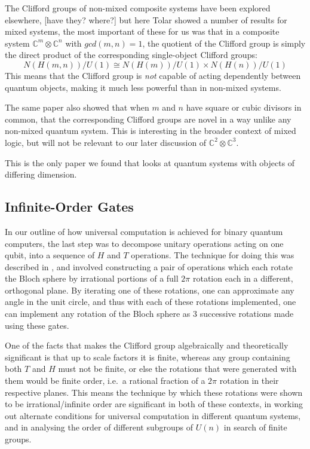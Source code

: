 The Clifford groups of non-mixed composite systems have been explored elsewhere, [have they? where?] but here Tolar showed a number of results for mixed systems, the most important of these for us was that in a composite system $\mathbb{C}^m \otimes \mathbb{C}^n$ with $gcd(m, n) = 1$, the quotient of the Clifford group is simply the direct product of the corresponding single-object Clifford groups:
\[N(H(m, n))/U(1) \cong N(H(m))/U(1) \times N(H(n))/U(1) \]
This means that the Clifford group is \emph{not} capable of acting dependently between quantum objects, making it much less powerful than in non-mixed systems.

The same paper also showed that when $m$ and $n$ have square or cubic divisors in common, that the corresponding Clifford groups are novel in a way unlike any non-mixed quantum system. This is interesting in the broader context of mixed logic, but will not be relevant to our later discussion of $\mathbb{C}^2 \otimes \mathbb{C}^3$.

This is the only paper we found that looks at quantum systems with objects of differing dimension.

\subsection{Infinite-Order Gates}
In our outline of how universal computation is achieved for binary quantum computers, the last step was to decompose unitary operations acting on one qubit, into a sequence of $H$ and $T$ operations. The technique for doing this was described in \cite{universal-qubit}, and involved constructing a pair of operations which each rotate the Bloch sphere by irrational portions of a full $2\pi$ rotation each in a different, orthogonal plane. By iterating one of these rotations, one can approximate any angle in the unit circle, and thus with each of these rotations implemented, one can implement any rotation of the Bloch sphere as 3 successive rotations made using these gates.

One of the facts that makes the Clifford group algebraically and theoretically significant is that up to scale factors it is finite, whereas any group containing both $T$ and $H$ must not be finite, or else the rotations that were generated with them would be finite order, i.e.\ a rational fraction of a $2\pi$ rotation in their respective planes. This means the technique by which these rotations were shown to be irrational/infinite order are significant in both of these contexts, in working out alternate conditions for universal computation in different quantum systems, and in analysing the order of different subgroups of $U(n)$ in search of finite groups.


